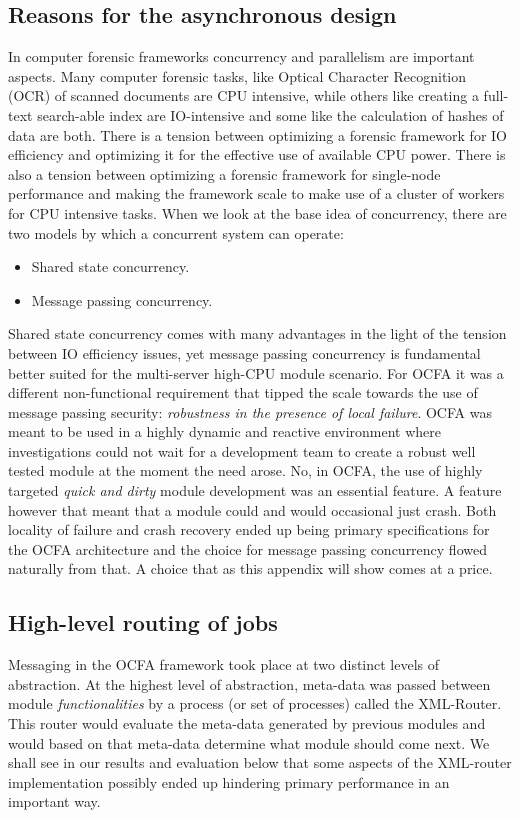 \subsection{Reasons for the asynchronous design}
In computer forensic frameworks concurrency and parallelism are important aspects. Many computer forensic tasks, like Optical Character Recognition (OCR) of scanned documents are CPU intensive, while others like creating a full-text search-able index are IO-intensive and some like the calculation of hashes of data are both. There is a tension between optimizing a forensic framework for IO efficiency and optimizing it for the effective use of available CPU power. There is also a tension between optimizing a forensic framework for single-node performance and making the framework scale to make use of a cluster of workers for CPU intensive tasks. When we look at the base idea of concurrency, there are two models by which a concurrent system can operate: 
\begin{itemize}
\item Shared state concurrency.
\item Message passing concurrency.
\end{itemize}
Shared state concurrency comes with many advantages in the light of the tension between IO efficiency issues, yet message passing concurrency is fundamental better suited for the multi-server high-CPU module scenario. For OCFA it was a different non-functional requirement that tipped the scale towards the use of message passing security: \emph{robustness in the presence of local failure}. OCFA was meant to be used in
a highly dynamic and reactive environment where investigations could not wait for a development team to create a robust well tested module at the moment the need arose. No, in OCFA, the use of highly targeted \emph{quick and dirty} module development was an essential feature. A feature however that meant that a module could and would occasional just crash. Both locality of failure and crash recovery ended up being primary specifications for the OCFA architecture and the choice for message passing concurrency flowed naturally from that. A choice that as this appendix will show comes at a price.
\subsection{High-level routing of jobs}
Messaging in the OCFA framework took place at two distinct levels of abstraction. At the highest level of abstraction, meta-data was passed between module \emph{functionalities} by a process (or set of processes) called the XML-Router. This router would evaluate the meta-data generated by previous modules and would based on that meta-data determine what module should come next. We shall see in our results and evaluation below that some aspects of the XML-router implementation possibly ended up hindering primary performance in an important way.
